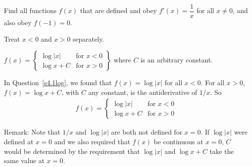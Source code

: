 \begin{question}
Find all functions $f(x)$ that are defined and obey $f'(x)=\dfrac{1}{x}$ for all $x\ne 0$, and also obey $f(-1)=0$.
\end{question}
\begin{hint}
Treat $x<0$ and $x>0$ separately.
\end{hint}
\begin{answer}
$f(x)=\left.\begin{cases}
             \log|x| &\text{for }x<0 \\
             \log x + C &\text{for }x>0
      \end{cases}\right\}$
      where $C$ is an arbitrary constant.
\end{answer}
\begin{solution}
In Question~\ref{s4.1log}, we found that $f(x)=\log|x|$ for all $x<0$. For all $x>0$, $f(x)=\log x +C$,
with $C$ any constant, is the antiderivative of $1/x$. So
\begin{align*}
f(x)=\begin{cases}
             \log|x| &\text{for }x<0 \\
             \log x + C &\text{for }x>0
      \end{cases}
\end{align*}


Remark: Note that $1/x$ and $\log|x|$ are both not defined for $x=0$. If $\log|x|$ were defined at $x=0$ and we also required that $f(x)$ be continuous at $x=0$, $C$ would be determined 
by the requirement that $\log|x|$ and $\log x + C$ take the same value at $x=0$.

\end{solution}


